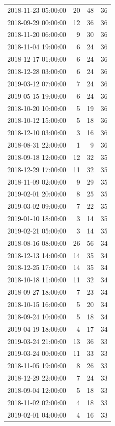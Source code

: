 \begin{tabular}{lrrr}
2018-11-23 05:00:00 & 20 & 48 & 36 \\
2018-09-29 00:00:00 & 12 & 36 & 36 \\
2018-11-20 06:00:00 & 9 & 30 & 36 \\
2018-11-04 19:00:00 & 6 & 24 & 36 \\
2018-12-17 01:00:00 & 6 & 24 & 36 \\
2018-12-28 03:00:00 & 6 & 24 & 36 \\
2019-03-12 07:00:00 & 7 & 24 & 36 \\
2019-05-15 19:00:00 & 6 & 24 & 36 \\
2018-10-20 10:00:00 & 5 & 19 & 36 \\
2018-10-12 15:00:00 & 5 & 18 & 36 \\
2018-12-10 03:00:00 & 3 & 16 & 36 \\
2018-08-31 22:00:00 & 1 & 9 & 36 \\
2018-09-18 12:00:00 & 12 & 32 & 35 \\
2018-12-29 17:00:00 & 11 & 32 & 35 \\
2018-11-09 02:00:00 & 9 & 29 & 35 \\
2019-02-01 20:00:00 & 8 & 25 & 35 \\
2019-03-02 09:00:00 & 7 & 22 & 35 \\
2019-01-10 18:00:00 & 3 & 14 & 35 \\
2019-02-21 05:00:00 & 3 & 14 & 35 \\
2018-08-16 08:00:00 & 26 & 56 & 34 \\
2018-12-13 14:00:00 & 14 & 35 & 34 \\
2018-12-25 17:00:00 & 14 & 35 & 34 \\
2018-10-18 11:00:00 & 11 & 32 & 34 \\
2018-09-27 18:00:00 & 7 & 23 & 34 \\
2018-10-15 16:00:00 & 5 & 20 & 34 \\
2018-09-24 10:00:00 & 5 & 18 & 34 \\
2019-04-19 18:00:00 & 4 & 17 & 34 \\
2019-03-24 21:00:00 & 13 & 36 & 33 \\
2019-03-24 00:00:00 & 11 & 33 & 33 \\
2018-11-05 19:00:00 & 8 & 26 & 33 \\
2018-12-29 22:00:00 & 7 & 24 & 33 \\
2018-09-04 12:00:00 & 5 & 18 & 33 \\
2018-11-02 02:00:00 & 4 & 18 & 33 \\
2019-02-01 04:00:00 & 4 & 16 & 33 \\

\end{tabular}
